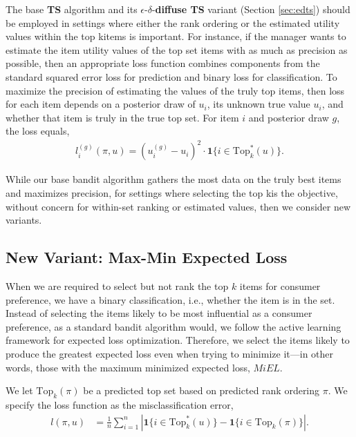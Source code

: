 \documentclass[nonblindrev]{informs3}
\newcommand{\ts}{\textbf{TS} }
\newcommand{\edts}{$\epsilon$-$\delta$-\textbf{diffuse TS} }
\newcommand{\numtopset}{k}
\newcommand{\topset}{\text{Top}_k}
\begin{document}
The base \ts algorithm and its \edts variant (Section \ref{sec:edts}) should be employed in settings where either the rank ordering or the estimated utility values within the top \numtopset items is important. For instance, if the manager wants to estimate the item utility values of the top set items with as much as precision as possible, then an appropriate loss function combines components from the standard squared error loss for prediction and binary loss for classification. To maximize the precision of estimating the values of the truly top items, then loss for each item depends on a posterior draw of $u_i$, its unknown true value $u_i$, and whether that item is truly in the true top set. For item $i$ and posterior draw $g$, the loss equals,
\begin{align}
l_i^{(g)}(\pi,u) = ( u_i^{(g)} - u_i )^2 \cdot \mathbf{1}\{ i \in \topset^{*}(u) \}.
\end{align}

While our base bandit algorithm gathers the most data on the truly best items and maximizes precision, for settings where selecting the top \numtopset is the objective, without concern for within-set ranking or estimated values, then we consider new variants.

\subsection{New Variant: Max-Min Expected Loss}

When we are required to select but not rank the top $k$ items for consumer preference, we have a binary classification, i.e., whether the item is in the set. Instead of selecting the items likely to be most influential as a consumer preference, as a standard bandit algorithm would, we follow the active learning framework for expected loss optimization. Therefore, we select the items likely to produce the greatest expected loss even when trying to minimize it---in other words, those with the maximum minimized expected loss, $MiEL$. 

We let $\topset(\pi)$ be a predicted top set based on predicted rank ordering $\pi$. We specify the loss function as the misclassification error,
\begin{align}
l(\pi,u) &= \frac{1}{n} \sum_{i=1}^{n} \left| \mathbf{1}\{ i \in \topset^{*}(u) \}-\mathbf{1}\{ i \in \topset(\pi) \} \right|.
\end{align}

\end{document}
